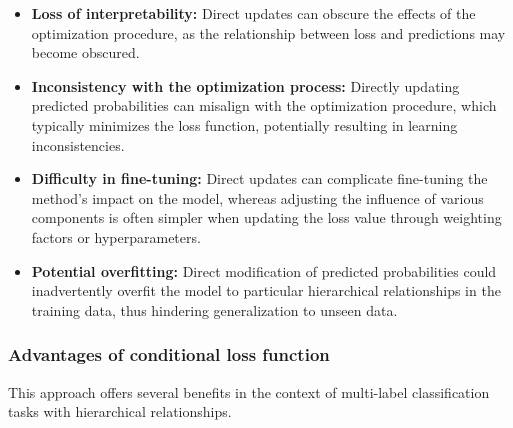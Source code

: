 \begin{itemize}
    \item \textbf{Loss of interpretability:} Direct updates can obscure the effects of the optimization procedure, as the relationship between loss and predictions may become obscured.

    \item \textbf{Inconsistency with the optimization process: }Directly updating predicted probabilities can misalign with the optimization procedure, which typically minimizes the loss function, potentially resulting in learning inconsistencies.

    \item \textbf{Difficulty in fine-tuning:} Direct updates can complicate fine-tuning the method's impact on the model, whereas adjusting the influence of various components is often simpler when updating the loss value through weighting factors or hyperparameters.

    \item \textbf{Potential overfitting:} Direct modification of predicted probabilities could inadvertently overfit the model to particular hierarchical relationships in the training data, thus hindering generalization to unseen data.
\end{itemize}

\subsubsection{Advantages of conditional loss function}

This approach offers several benefits in the context of multi-label classification tasks with hierarchical relationships.

